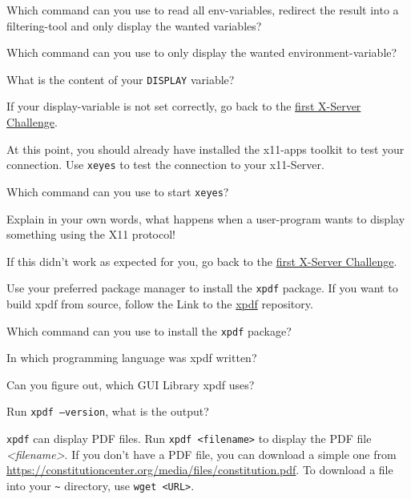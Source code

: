 \begin{challenge}
\begin{task}
\begin{questions}
        \item Which command can you use to read all env-variables, redirect the result into a filtering-tool and only display the wanted variables?
        \item Which command can you use to only display the wanted environment-variable?
        \item What is the content of your \texttt{DISPLAY} variable?
    \end{questions}
    If your display-variable is not set correctly, go back to the \href{https://www.github.com/STEMgraph/}{first X-Server Challenge}.
    \end{task}
    \begin{task}
    At this point, you should already have installed the x11-apps toolkit to test your connection. Use \texttt{xeyes} to test the connection to your x11-Server.
    \begin{questions}
        \item Which command can you use to start \texttt{xeyes}?
        \item Explain in your own words, what happens when a user-program wants to display something using the X11 protocol!
    \end{questions}
    If this didn't work as expected for you, go back to the \href{https://www.github.com/STEMgraph/}{first X-Server Challenge}.
    \end{task}
    \begin{task}
    Use your preferred package manager to install the \texttt{xpdf} package. If you want to build xpdf from source, follow the Link to the \href{https://gitlab.com/xpdf-mirror/xpdf}{xpdf} repository.
    \begin{questions}
        \item Which command can you use to install the \texttt{xpdf} package?
        \item In which programming language was xpdf written?
        \item Can you figure out, which GUI Library xpdf uses?
        \item Run \texttt{xpdf --version}, what is the output?
    \end{questions}
    \end{task}
    \begin{task}
    \texttt{xpdf} can display PDF files. Run \texttt{xpdf <filename>} to display the PDF file \textit{<filename>}. If you don't have a PDF file, you can download a simple one from \href{https://constitutioncenter.org/media/files/constitution.pdf}{https://constitutioncenter.org/media/files/constitution.pdf}. To download a file into your \texttt{\textasciitilde} directory, use \texttt{wget <URL>}.

\end{task}
\end{challenge}
